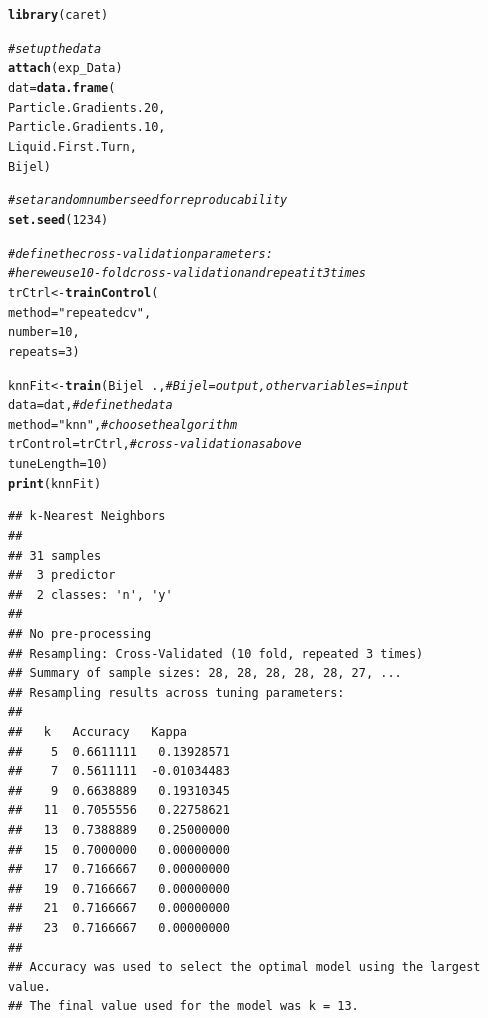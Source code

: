 \documentclass{article}\usepackage[]{graphicx}\usepackage[]{color}
\makeatletter
\newcommand{\hlnum}[1]{\textcolor[rgb]{0.686,0.059,0.569}{#1}}%
\newcommand{\hlstr}[1]{\textcolor[rgb]{0.192,0.494,0.8}{#1}}%
\newcommand{\hlcom}[1]{\textcolor[rgb]{0.678,0.584,0.686}{\textit{#1}}}%
\newcommand{\hlopt}[1]{\textcolor[rgb]{0,0,0}{#1}}%
\newcommand{\hlstd}[1]{\textcolor[rgb]{0.345,0.345,0.345}{#1}}%
\newcommand{\hlkwb}[1]{\textcolor[rgb]{0.69,0.353,0.396}{#1}}%
\newcommand{\hlkwc}[1]{\textcolor[rgb]{0.333,0.667,0.333}{#1}}%
\newcommand{\hlkwd}[1]{\textcolor[rgb]{0.737,0.353,0.396}{\textbf{#1}}}%
\newenvironment{kframe}{%
 \def\at@end@of@kframe{}%
 \ifinner\ifhmode%
  \def\at@end@of@kframe{\end{minipage}}%
  \begin{minipage}{\columnwidth}%
 \fi\fi%
 \def\FrameCommand##1{\hskip\@totalleftmargin \hskip-\fboxsep
 \colorbox{shadecolor}{##1}\hskip-\fboxsep
     \hskip-\linewidth \hskip-\@totalleftmargin \hskip\columnwidth}%
 \MakeFramed {\advance\hsize-\width
   \@totalleftmargin\z@ \linewidth\hsize
   \@setminipage}}%
 {\par\unskip\endMakeFramed%
 \at@end@of@kframe}
\newenvironment{knitrout}{}{} %
\makeatother
\begin{document}
\begin{knitrout}
\color{fgcolor}\begin{kframe}
\begin{alltt}
\hlkwd{library}\hlstd{(caret)}
\end{alltt}


{\ttfamily\noindent\itshape\color{messagecolor}{\#\# Loading required package: lattice}}\begin{alltt}
\hlcom{# set up the data}
\hlkwd{attach}\hlstd{(exp_Data)}
\hlstd{dat}\hlkwb{=}\hlkwd{data.frame}\hlstd{(}
  \hlstd{Particle.Gradients.20,}
  \hlstd{Particle.Gradients.10,}
  \hlstd{Liquid.First.Turn,}
  \hlstd{Bijel)}

\hlcom{# set a random number seed for reproducability}
\hlkwd{set.seed}\hlstd{(}\hlnum{1234}\hlstd{)}

\hlcom{# define the cross-validation parameters:}
\hlcom{# here we use 10-fold cross-validation and repeat it 3 times}
\hlstd{trCtrl} \hlkwb{<-} \hlkwd{trainControl}\hlstd{(}
  \hlkwc{method} \hlstd{=} \hlstr{"repeatedcv"}\hlstd{,}
  \hlkwc{number} \hlstd{=} \hlnum{10}\hlstd{,}
  \hlkwc{repeats} \hlstd{=} \hlnum{3}\hlstd{)}

\hlstd{knnFit} \hlkwb{<-} \hlkwd{train}\hlstd{(Bijel}\hlopt{~}\hlstd{.,} \hlcom{# Bijel = output, other variables = input}
                \hlkwc{data}\hlstd{=dat,} \hlcom{# define the data}
                \hlkwc{method}\hlstd{=}\hlstr{"knn"}\hlstd{,} \hlcom{# choose the algorithm}
                \hlkwc{trControl}\hlstd{=trCtrl,} \hlcom{# cross-validation as above}
                \hlkwc{tuneLength}\hlstd{=}\hlnum{10}\hlstd{)}
\hlkwd{print}\hlstd{(knnFit)}
\end{alltt}
\begin{verbatim}
## k-Nearest Neighbors 
## 
## 31 samples
##  3 predictor
##  2 classes: 'n', 'y' 
## 
## No pre-processing
## Resampling: Cross-Validated (10 fold, repeated 3 times) 
## Summary of sample sizes: 28, 28, 28, 28, 28, 27, ... 
## Resampling results across tuning parameters:
## 
##   k   Accuracy   Kappa      
##    5  0.6611111   0.13928571
##    7  0.5611111  -0.01034483
##    9  0.6638889   0.19310345
##   11  0.7055556   0.22758621
##   13  0.7388889   0.25000000
##   15  0.7000000   0.00000000
##   17  0.7166667   0.00000000
##   19  0.7166667   0.00000000
##   21  0.7166667   0.00000000
##   23  0.7166667   0.00000000
## 
## Accuracy was used to select the optimal model using the largest value.
## The final value used for the model was k = 13.
\end{verbatim}
\end{kframe}
\end{knitrout}
\end{document}
